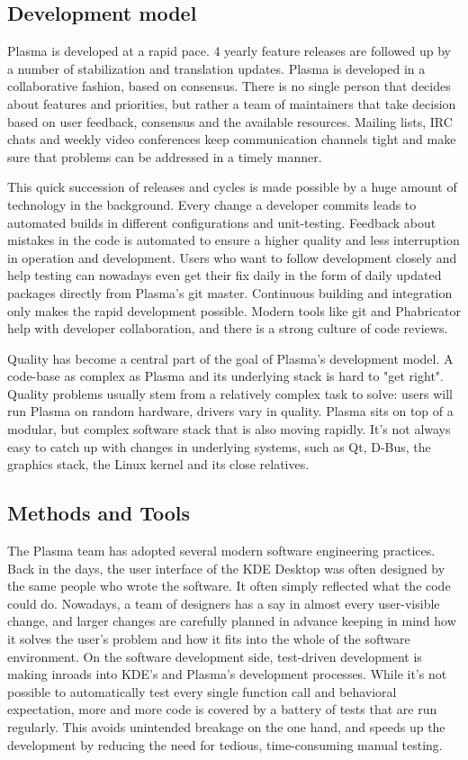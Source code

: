 \subsection*{Development model}

Plasma is developed at a rapid pace. 4 yearly feature releases are followed up by a number of stabilization and translation updates.
Plasma is developed in a collaborative fashion, based on consensus. There is no single person that decides about features and priorities, but rather a team of maintainers that take decision based on user feedback, consensus and the available resources. Mailing lists, IRC chats and weekly video conferences keep communication channels tight and make sure that problems can be addressed in a timely manner.

This quick succession of releases and cycles is made possible by a huge amount of technology in the background. Every change a developer commits leads to automated builds in different configurations and unit-testing. Feedback about mistakes in the code is automated to ensure a higher quality and less interruption in operation and development. Users who want to follow development closely and help testing can nowadays even get their fix daily in the form of daily updated packages directly from Plasma's git master. Continuous building and integration only makes the rapid development possible.
Modern tools like git and Phabricator help with developer collaboration, and there is a strong culture of code reviews.

Quality has become a central part of the goal of Plasma's development model. A code-base as complex as Plasma and its underlying stack is hard to "get right". Quality problems usually stem from a relatively complex task to solve: users will run Plasma on random hardware, drivers vary in quality. Plasma sits on top of a modular, but complex software stack that is also moving rapidly. It's not always easy to catch up with changes in underlying systems, such as Qt, D-Bus, the graphics stack, the Linux kernel and its close relatives.

\subsection*{Methods and Tools}

The Plasma team has adopted several modern software engineering practices. Back in the days, the user interface of the KDE Desktop was often designed by the same people who wrote the software. It often simply reflected what the code could do. Nowadays, a team of designers has a say in almost every user-visible change, and larger changes are carefully planned in advance keeping in mind how it solves the user's problem and how it fits into the whole of the software environment.
On the software development side, test-driven development is making inroads into KDE's and Plasma's development processes. While it's not possible to automatically test every single function call and behavioral expectation, more and more code is covered by a battery of tests that are run regularly. This avoids unintended breakage on the one hand, and speeds up the development by reducing the need for tedious, time-consuming manual testing.


